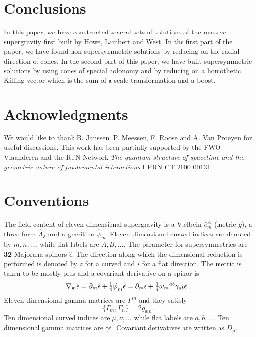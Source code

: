 \documentclass[a4paper,12pt]{article}
\newcommand{\ft}[2]{{\textstyle\frac{#1}{#2}}}
\begin{document}
\section{Conclusions}\label{conclusions}
In this paper, we have constructed several sets of solutions of the massive supergravity first built by
Howe, Lambert and West. In the first part of the paper, we have found non-supersymmetric solutions by reducing on the
radial direction of cones. In the second part of this paper, we have built supersymmetric solutions by
using cones of special holonomy and by reducing on a homothetic Killing vector which is the sum of a scale
transformation and a boost.
\section*{Acknowledgments}
We would like to thank B. Janssen, P. Meessen, F. Roose and A. Van Proeyen
for useful discussions. This work has been partially supported by the FWO-Vlaanderen and the RTN Network
\emph{The quantum structure of spacetime and the geometric nature of fundamental
interactions} HPRN-CT-2000-00131.
\appendix
\section{Conventions}\label{conventions}
The field content of eleven dimensional supergravity is a Vielbein $\hat{e}_m^A$ (metric $\hat{g}$), a three form $\hat{A}_3$ and a gravitino $\hat{\psi}_m$. Eleven dimensional curved indices are denoted by $m,n,\dots$, while flat labels are $A,B,\dots$. The parameter for supersymmetries are $\mathbf{32}$ Majorana spinors $\hat{\epsilon}$. The direction along which the dimensional reduction is performed is denoted by $z$ for a curved and $i$ for a flat direction. The metric is taken to be mostly plus and a covariant derivative on a spinor is 
\begin{equation}
\nabla_m \hat{\epsilon}=\partial_m \hat{\epsilon}+\ft14 \slashed{\omega}_m \hat{\epsilon}=\partial_m \hat{\epsilon}+\ft14 \omega_m{}^{ab} \gamma_{ab} \hat{\epsilon}\; .
\end{equation}
Eleven dimensional gamma matrices are $\Gamma^m$ and they satisfy
\begin{equation}
\{ \Gamma_m , \Gamma_n \}=2g_{mn}.
\end{equation}
Ten dimensional curved indices are $\mu, \nu, \dots$ while flat labels are $a,b,\dots$. Ten dimensional gamma matrices are $\gamma^\mu$. Covariant derivatives are written as $D_\mu$. 
\end{document}
